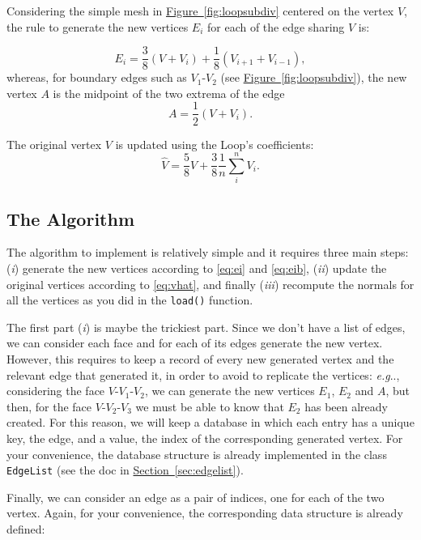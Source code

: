 \documentclass[a4paper,11pt]{article}
\makeatletter
\DeclareRobustCommand\onedot{\futurelet\@let@token\@onedot}
\def\@onedot{\ifx\@let@token.\else.\null\fi\xspace}
\def\eg{\emph{e.g}\onedot} \def\Eg{\emph{E.g}\onedot}
\newcommand{\hilight}[1]{\colorbox{bg}{#1}}
\newcommand{\coden}[1]{\texttt{#1}}
\newcommand{\code}[1]{\hilight{\texttt{#1}}}
\newcommand{\fig}[1]{\hyperref[#1]{\mbox{Figure \ref*{#1}}}\xspace}
\newcommand{\sect}[1]{\hyperref[#1]{\mbox{Section \ref*{#1}}}\xspace}
\makeatother
\begin{document}
Considering the simple mesh in \fig{fig:loopsubdiv} centered on the vertex $V$, the rule to generate the new vertices $E_i$ for each of the edge sharing $V$ is:

\begin{equation} \label{eq:ei}
E_i = \frac{3}{8} \left(V + V_i\right) + \frac{1}{8} \left(V_{i+1} + V_{i-1}\right),
\end{equation} 
whereas, for boundary edges such as $V_1$-$V_2$ (see \fig{fig:loopsubdiv}), the new vertex $A$ is the midpoint of the two extrema of the edge
\begin{equation} \label{eq:eib}
A = \frac{1}{2} \left(V + V_i\right) .
\end{equation} 

\noindent The original vertex $V$ is updated using the Loop's coefficients:
\begin{equation} \label{eq:vhat}
\hat{V} = \frac{5}{8} V  + \frac{3}{8} \frac{1}{n} \sum_i^n V_i.
\end{equation} 


\subsection{The Algorithm}

The algorithm to implement is relatively simple and it requires three main steps: (\emph{i}) generate the new vertices according to \eqref{eq:ei} and \eqref{eq:eib}, (\emph{ii}) update the original vertices according to \eqref{eq:vhat}, and finally (\emph{iii}) recompute the normals for all the vertices as you did in the \coden{load()} function.

The first part (\emph{i}) is maybe the trickiest part. Since we don't have a list of edges, we can consider each face and for each of its edges generate the new vertex. However, this requires to keep a record of every new generated vertex and the relevant edge that generated it, in order to avoid to replicate the vertices: \eg, considering the face $V$-$V_1$-$V_2$, we can generate the new vertices $E_1$, $E_2$ and $A$, but then, for the face $V$-$V_2$-$V_3$ we must be able to know that $E_2$ has been already created. For this reason, we will keep a database in which each entry has a unique key, the edge, and a value, the index of the corresponding generated vertex. For your convenience, the database structure is already implemented in the class \code{EdgeList} (see the doc in \sect{sec:edgelist}).

Finally, we can consider an edge as a pair of indices, one for each of the two vertex. Again, for your convenience, the corresponding data structure is already defined:
\end{document}
